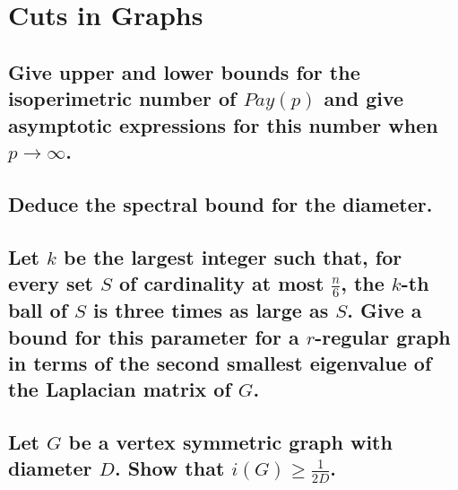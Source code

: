 \section{Cuts in Graphs}

\subsection[Cuts - 2]{Give upper and lower bounds for the isoperimetric number of $Pay(p)$ and give asymptotic expressions for this number when $p \rightarrow \infty$.}

\subsection[Cuts - 3]{Deduce the spectral bound for the diameter.}

\subsection[Cuts - 4]{Let $k$ be the largest integer such that, for every set $S$ of cardinality at most $\frac{n}{6}$, the $k$-th ball of $S$ is three times as large as $S$. Give a bound for this parameter for a $r$-regular graph in terms of the second smallest eigenvalue of the Laplacian matrix of $G$.}

\subsection[Cuts - 6]{Let $G$ be a vertex symmetric graph with diameter $D$. Show that $i(G) \geq \frac{1}{2D}$.}
